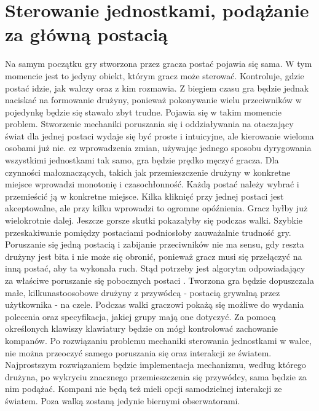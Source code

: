 \chapter{Sterowanie jednostkami, podążanie za główną postacią}\label{chap:sjpzgp}

    Na samym początku gry stworzona przez gracza postać pojawia się sama. W tym momencie jest to jedyny obiekt, którym gracz może sterować. Kontroluje, gdzie postać idzie, jak walczy oraz z kim rozmawia. Z biegiem czasu gra będzie jednak naciskać na formowanie drużyny, ponieważ pokonywanie wielu przeciwników w pojedynkę będzie się stawało zbyt trudne. Pojawia się w takim momencie problem. Stworzenie mechaniki poruszania się i oddziaływania na otaczający świat dla jednej postaci wydaje się być proste i intuicyjne, ale kierowanie wieloma osobami już nie. 
    ez wprowadzenia zmian, używając jednego sposobu dyrygowania wszystkimi jednostkami tak samo, gra będzie prędko męczyć gracza. Dla czynności małoznaczących, takich jak przemieszczenie drużyny w konkretne miejsce wprowadzi monotonię i czasochłonność. Każdą postać należy wybrać i przemieścić ją w konkretne miejsce. Kilka kliknięć przy jednej postaci jest akceptowalne, ale przy kilku wprowadzi to ogromne opóźnienia. Gracz byłby już wielokrotnie dalej. Jeszcze gorsze skutki pokazałyby się podczas walki. Szybkie przeskakiwanie pomiędzy postaciami podniosłoby zauważalnie trudność gry. Poruszanie się jedną postacią i zabijanie przeciwników nie ma sensu, gdy reszta drużyny jest bita i nie może się obronić, ponieważ gracz musi się przełączyć na inną postać, aby ta wykonała ruch. Stąd potrzeby jest algorytm odpowiadający za właściwe poruszanie się pobocznych postaci .
    Tworzona gra będzie dopuszczała małe, kilkunastoosobowe drużyny z przywódcą - postacią grywalną przez użytkownika - na czele. Podczas walki graczowi pokażą się możliwe do wydania polecenia oraz specyfikacja, jakiej grupy mają one dotyczyć. Za pomocą określonych klawiszy klawiatury będzie on mógł kontrolować zachowanie kompanów.
    Po rozwiązaniu problemu mechaniki sterowania jednostkami w walce, nie można przeoczyć samego poruszania się oraz interakcji ze światem. Najprostszym rozwiązaniem będzie implementacja mechanizmu, według którego drużyna, po wykryciu znacznego przemieszczenia się przywódcy, sama będzie za nim podążać. Kompani nie będą też mieli opcji samodzielnej interakcji ze światem. Poza walką zostaną jedynie biernymi obserwatorami.

